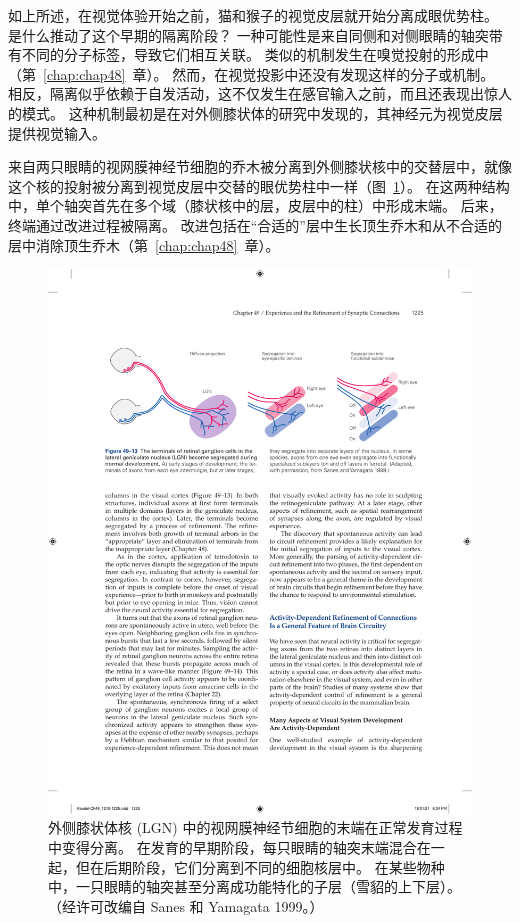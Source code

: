 如上所述，在视觉体验开始之前，猫和猴子的视觉皮层就开始分离成眼优势柱。
是什么推动了这个早期的隔离阶段？
一种可能性是来自同侧和对侧眼睛的轴突带有不同的分子标签，导致它们相互关联。
类似的机制发生在嗅觉投射的形成中（第~\ref{chap:chap48}~章）。
然而，在视觉投影中还没有发现这样的分子或机制。
相反，隔离似乎依赖于自发活动，这不仅发生在感官输入之前，而且还表现出惊人的模式。
这种机制最初是在对外侧膝状体的研究中发现的，其神经元为视觉皮层提供视觉输入。


来自两只眼睛的视网膜神经节细胞的乔木被分离到外侧膝状核中的交替层中，就像这个核的投射被分离到视觉皮层中交替的眼优势柱中一样（图~\ref{fig:49_13}）。 
在这两种结构中，单个轴突首先在多个域（膝状核中的层，皮层中的柱）中形成末端。
后来，终端通过改进过程被隔离。
改进包括在“合适的”层中生长顶生乔木和从不合适的层中消除顶生乔木（第~\ref{chap:chap48}~章）。


\begin{figure}[htbp]
	\centering
	\includegraphics[width=0.9\linewidth]{chap49/fig_49_13}
	\caption{外侧膝状体核 (LGN) 中的视网膜神经节细胞的末端在正常发育过程中变得分离。 在发育的早期阶段，每只眼睛的轴突末端混合在一起，但在后期阶段，它们分离到不同的细胞核层中。 在某些物种中，一只眼睛的轴突甚至分离成功能特化的子层（雪貂的上下层）。 （经许可改编自 Sanes 和 Yamagata 1999。）}
	\label{fig:49_13}
\end{figure}


